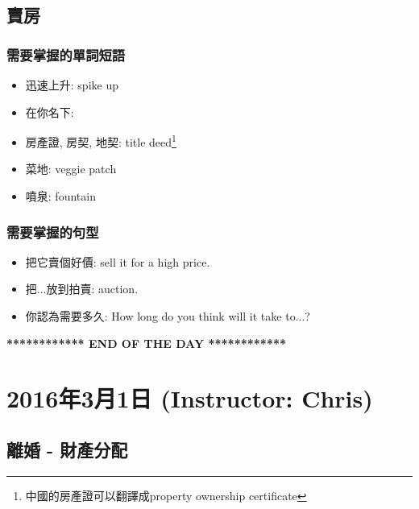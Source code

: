 \subsection{賣房}
\subsubsection*{需要掌握的單詞短語}
\begin{multicols}{2}
\begin{itemize}
  \itemsep0em
  \item 迅速上升: spike up
  \item 在你名下: 
  \item 房產證, 房契, 地契: title deed\footnote{中國的房產證可以翻譯成property ownership certificate}
  \item 菜地: veggie patch
  \item 噴泉: fountain
\end{itemize}
\end{multicols}

\subsubsection*{需要掌握的句型}
\begin{multicols}{2}
\begin{itemize}
  \itemsep0em
  \item 把它賣個好價: sell it for a high price.
  \item 把...放到拍賣:  auction.
  \item 你認為需要多久: How long do you think will it take to...?
\end{itemize}
\end{multicols}

\vspace{15mm}

\begin{center}
  \textbf{************ END OF THE DAY ************}
\end{center}

\section{2016年3月1日 (Instructor: Chris)}
\subsection{離婚 - 財產分配}
